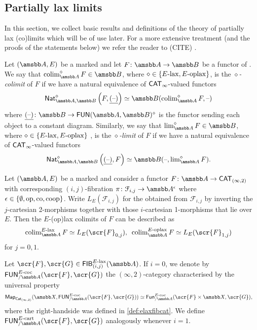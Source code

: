 \documentclass[10pt,a4paper]{amsart}
\begin{document}
 \subsection{Partially lax limits}
 In this section, we collect basic results and definitions of the theory of partially lax (co)limits which will be of use later. For a more extensive treatment (and the proofs of the statements below) we refer the reader to (CITE) .
 \begin{defn}
  Let $(\tA, E)$ be a marked \itcat{} and let $F\colon \tc{A} \to \tc{B}$ be a functor of \itcats{}. We say that $\colim^{\diamond}_{\tc{A}}F \in \tc{B}$, where $\diamond \in \{E\text{\textup{-lax}}, E\text{\textup{-oplax}} \}$, is the \emph{$\diamond$-colimit} of $F$ if  we have a natural equivalence of $\textup{\textmd{\textsf{CAT}}}_{\infty}$-valued functors
  \[
    \Nat^{\diamond}_{\tc{A},\tB}\left(F, \underline{(\blank)}\right)\simeq \tc{B}(\colim^{\diamond}_{\tc{A}}F, \blank)
  \]
  where $\underline{(\blank)}\colon \tc{B} \to \FUN(\tc{A},\tc{B})^{\diamond}$ is the functor sending each object to a constant diagram. Similarly, we say that
  $\lim^{\diamond}_{\tc{A}}F \in \tc{B}$, where $\diamond \in \{E\text{\textup{-lax}}, E\text{\textup{-oplax}} \}$ , is the \emph{$\diamond$-limit} of $F$ if  we have a natural equivalence of $\textup{\textmd{\textsf{CAT}}}_{\infty}$-valued functors
   \[
     \Nat^{\diamond}_{\tc{A},\tB}\left(\underline{(\blank)},F\right)
     \simeq \tB(\blank,\lim^{\diamond}_{\tc{A}}F).
   \]
\end{defn}
\begin{propn}\label{prop:laxcolimloc}
  Let $(\tA,E)$ be a marked \itcat{} and consider a functor $F \colon\tc{A} \to \CATIT$ with corresponding $(i,j)$-fibration  $\pi \colon\mathcal{F}_{i,j} \to \tc{A}^{\epsilon}$ where $\epsilon\in\{\emptyset,\text{\textup{op}},\text{\textup{co}},\text{\textup{coop}}\}$. Write $L_{E}(\mathcal{F}_{i,j})$ for the \itcat{} obtained from $\mathcal{F}_{i,j}$ by inverting the $j$-cartesian 2-morphisms together with those $i$-cartesian 1-morphisms that lie over $E$. Then the $E$-(op)lax colimits of $F$ can be described as
  \[
     \colim^{\elax}_{\tc{A}}F \simeq L_{E}(\scr{F}_{0,j}), \enspace \colim^{\eoplax}_{\tc{A}}F \simeq L_E(\scr{F}_{1,j})
   \]
   for $j = 0,1$.
\end{propn}
\begin{defn}\label{def:FUNdcoc}
  Let $\scr{F},\scr{G} \in \FIB^{\elax}_{(i,j)}(\tA)$. If $i=0$, we denote by $\FUN^{E\dcoc}_{/\tc{A}}(\scr{F},\scr{G})$ the $(\infty,2)$-category characterised by the universal property
  \[
    \Map_{\CatIT}(\tX,\FUN^{E\dcoc}_{/\tc{A}}(\scr{F},\scr{G})) \simeq \Fun^{E\dcoc}_{/\tc{A}}(\scr{F}\times \tX,\scr{G}),
  \]
  where the right-handside was defined in \cref{def:elaxfibcat}. We define $\FUN^{E\dcart}_{/\tc{A}}(\scr{F},\scr{G})$ analogously whenever $i=1$.
\end{defn}
\end{document}
